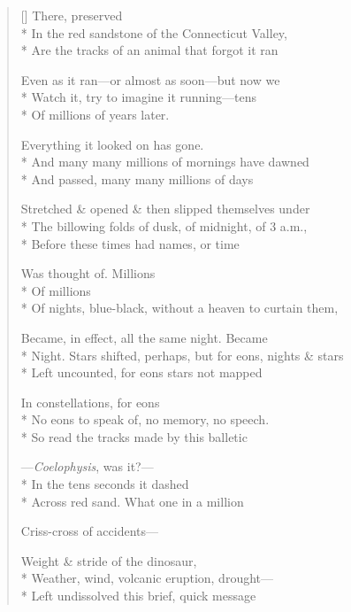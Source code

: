 \label{ch:triassic_sandstone}
\settowidth{\versewidth}{The eyes of a creature that can't return our gaze, nor ever look}
\begin{verse}[\versewidth]
\hspace{4\vgap} There, preserved\\*
In the red sandstone of the Connecticut Valley,\\*
Are the tracks of an animal that forgot it ran 

Even as it ran---or almost as soon---but now we\\*
Watch it, try to imagine it running---tens \\*
Of millions of years later.

Everything it looked on has gone.\\*
And many many millions of mornings have dawned\\*
And passed, many many millions of days

Stretched \& opened \& then slipped themselves under\\*
The billowing folds of dusk, of midnight, of 3 a.m.,\\*
Before these times had names, or time

Was thought of.     Millions\\*
Of millions\\*
Of nights, blue-black, without a heaven to curtain them,

Became, in effect, all the same night. Became \\*
Night. Stars shifted, perhaps, but for eons, nights \& stars\\*
Left uncounted, for eons stars not mapped

In constellations, for eons\\*
No eons to speak of, no memory, no speech.\\*
\hspace{4\vgap} So read the tracks made by this balletic

---\textit{Coelophysis}, was it?---\\*
 In the tens seconds it dashed\\*
Across red sand. What one in a million

Criss-cross of accidents---

Weight \& stride of the dinosaur,\\*
Weather, wind, volcanic eruption, drought---\\*
Left undissolved this brief, quick message


\end{verse}

